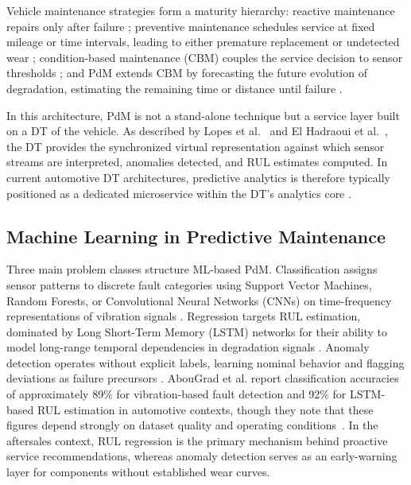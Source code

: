 \documentclass[conference,a4paper]{IEEEtran}
\begin{document}
Vehicle maintenance strategies form a maturity hierarchy: reactive maintenance repairs only after failure \cite{abougrad2026xai}; preventive maintenance schedules service at fixed mileage or time intervals, leading to either premature replacement or undetected wear \cite{abougrad2026xai,aichi2024multilayered}; condition-based maintenance (CBM) couples the service decision to sensor thresholds \cite{aichi2024multilayered}; and PdM extends CBM by forecasting the future evolution of degradation, estimating the remaining time or distance until failure \cite{kumar2025suspension,abougrad2026xai}.

In this architecture, PdM is not a stand-alone technique but a service layer built on a DT of the vehicle. As described by Lopes et al.~\cite{lopes2025vehicledt} and El Hadraoui et al.~\cite{aichi2024multilayered}, the DT provides the synchronized virtual representation against which sensor streams are interpreted, anomalies detected, and RUL estimates computed. In current automotive DT architectures, predictive analytics is therefore typically positioned as a dedicated microservice within the DT's analytics core \cite{lopes2025vehicledt,karthick2025simulating}.

\subsection{Machine Learning in Predictive Maintenance}

Three main problem classes structure ML-based PdM. Classification assigns sensor patterns to discrete fault categories using Support Vector Machines, Random Forests, or Convolutional Neural Networks (CNNs) on time-frequency representations of vibration signals \cite{kumar2025suspension,abougrad2026xai}. Regression targets RUL estimation, dominated by Long Short-Term Memory (LSTM) networks for their ability to model long-range temporal dependencies in degradation signals \cite{karthick2025simulating,abougrad2026xai}. Anomaly detection operates without explicit labels, learning nominal behavior and flagging deviations as failure precursors \cite{karthick2025simulating,abougrad2026xai}. AbouGrad et al. report classification accuracies of approximately 89\% for vibration-based fault detection and 92\% for LSTM-based RUL estimation in automotive contexts, though they note that these figures depend strongly on dataset quality and operating conditions~\cite{abougrad2026xai}. In the aftersales context, RUL regression is the primary mechanism behind proactive service recommendations, whereas anomaly detection serves as an early-warning layer for components without established wear curves.
\end{document}
